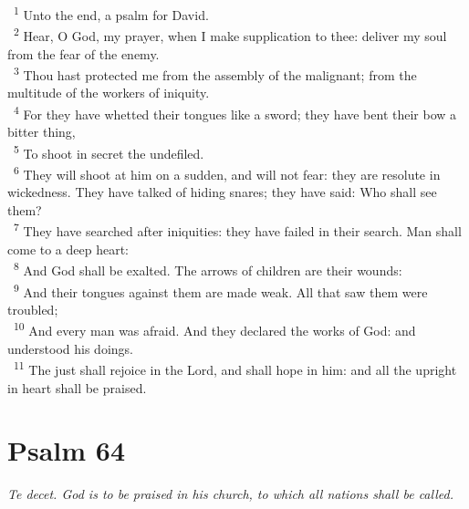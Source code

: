 \documentclass[a5paper,12pt]{article}
\begin{document}
\begin{multicols*}{2}
~\textsuperscript{1} Unto the end, a psalm for David.\\
~\textsuperscript{2} Hear, O God, my prayer, when I make supplication to thee: deliver my soul from the fear of the enemy.\\
~\textsuperscript{3} Thou hast protected me from the assembly of the malignant; from the multitude of the workers of iniquity.\\
~\textsuperscript{4} For they have whetted their tongues like a sword; they have bent their bow a bitter thing,\\
~\textsuperscript{5} To shoot in secret the undefiled.\\
~\textsuperscript{6} They will shoot at him on a sudden, and will not fear: they are resolute in wickedness. They have talked of hiding snares; they have said: Who shall see them?\\
~\textsuperscript{7} They have searched after iniquities: they have failed in their search. Man shall come to a deep heart:\\
~\textsuperscript{8} And God shall be exalted. The arrows of children are their wounds:\\
~\textsuperscript{9} And their tongues against them are made weak. All that saw them were troubled;\\
~\textsuperscript{10} And every man was afraid. And they declared the works of God: and understood his doings.\\
~\textsuperscript{11} The just shall rejoice in the Lord, and shall hope in him: and all the upright in heart shall be praised.\\

\section{Psalm 64}
\label{sec:orgf211bbc}
\emph{Te decet. God is to be praised in his church, to which all nations shall be called.}\\


\end{multicols*}
\end{document}
